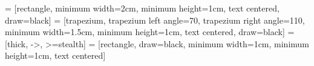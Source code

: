 \usepackage{xcolor}
\usepackage{mathtools}

\usepackage{tikz}
\usetikzlibrary{shapes.geometric, arrows, positioning}

 = [rectangle, minimum width=2cm, minimum height=1cm, text centered, draw=black]
 = [trapezium, trapezium left angle=70, trapezium right angle=110, minimum width=1.5cm, minimum height=1cm, text centered, draw=black]
 = [thick, ->, >=stealth]
 = [rectangle, draw=black, minimum width=1cm, minimum height=1cm, text centered]

\usepackage{hyperref}
\hypersetup{
    colorlinks=true, %
    linktoc=all,     %
    linkcolor=GbBlueNt,    %
    citecolor=GbGreenNt,   %
    urlcolor=GbBlueDk      %
}

\usepackage{algorithm}
\usepackage{algpseudocode}

\newcommand{\Desc}[2]{\hspace*{\algorithmicindent} \makebox[14.5em][l]{#1}\parbox[t]{32em}{#2}}

\usepackage[style=iso]{datetime2}

\usepackage{float}
\let\origfigure\figure
\let\endorigfigure\endfigure
\renewenvironment{figure}[1][2] {
    \expandafter\origfigure\expandafter[H]
} {
    \endorigfigure
}

